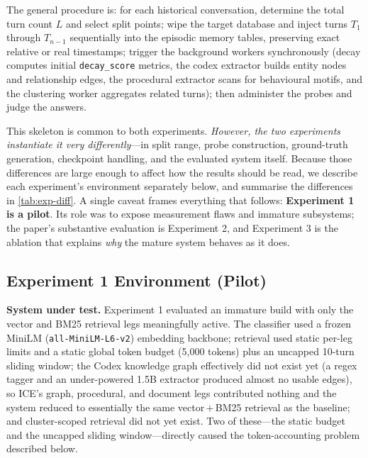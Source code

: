 \documentclass[10pt]{article}
\begin{document}
The general procedure is: for each historical conversation, determine the total turn count $L$ and select split points; wipe the target database and inject turns $T_1$ through $T_{n-1}$ sequentially into the episodic memory tables, preserving exact relative or real timestamps; trigger the background workers synchronously (decay computes initial \texttt{decay\_score} metrics, the codex extractor builds entity nodes and relationship edges, the procedural extractor scans for behavioural motifs, and the clustering worker aggregates related turns); then administer the probes and judge the answers.

This skeleton is common to both experiments. \emph{However, the two experiments instantiate it very differently}---in split range, probe construction, ground-truth generation, checkpoint handling, and the evaluated system itself. Because those differences are large enough to affect how the results should be read, we describe each experiment's environment separately below, and summarise the differences in \cref{tab:exp-diff}. A single caveat frames everything that follows: \textbf{Experiment 1 is a pilot}. Its role was to expose measurement flaws and immature subsystems; the paper's substantive evaluation is Experiment 2, and Experiment 3 is the ablation that explains \emph{why} the mature system behaves as it does.

\subsection{Experiment 1 Environment (Pilot)}
\label{sec:exp1-env}

\textbf{System under test.} Experiment 1 evaluated an immature build with only the vector and BM25 retrieval legs meaningfully active. The classifier used a frozen MiniLM (\texttt{all-MiniLM-L6-v2}) embedding backbone; retrieval used static per-leg limits and a static global token budget (5{,}000 tokens) plus an uncapped 10-turn sliding window; the Codex knowledge graph effectively did not exist yet (a regex tagger and an under-powered 1.5B extractor produced almost no usable edges), so ICE's graph, procedural, and document legs contributed nothing and the system reduced to essentially the same vector\,$+$\,BM25 retrieval as the baseline; and cluster-scoped retrieval did not yet exist. Two of these---the static budget and the uncapped sliding window---directly caused the token-accounting problem described below.
\end{document}
